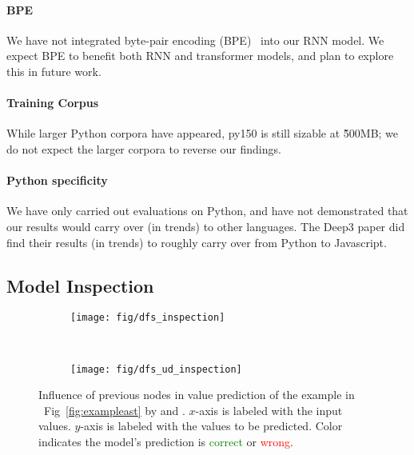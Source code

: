 \documentclass[nonacm, sigconf]{acmart}
\newcommand{\figref}[1]{Fig~\ref{#1}}
\begin{document}
\paragraph{BPE}
We have not integrated byte-pair encoding (BPE)~\cite{karampatsis2020big-bpe} into our RNN model. We expect BPE to benefit both RNN and transformer models, and plan to explore this in future work.

\paragraph{Training Corpus}
While larger Python corpora have appeared,  py150 is still sizable at \~ 500MB; we do not expect the larger corpora to reverse our findings.

\paragraph{Python specificity}
We have only carried out evaluations on Python, and have not demonstrated that our results would carry over (in trends) to other languages.  The Deep3 paper did find their results (in trends) to roughly carry over from Python to Javascript.



 
\subsection{Model Inspection}
\label{sec:inspection}

\begin{figure}
    \centering
    \begin{subfigure}[b]{0.5\textwidth}
        \texttt{[image: fig/dfs\_inspection]}
        \caption{\DFS}
        \label{fig:dfs-pred-influence}
    \end{subfigure}
    \\
\begin{subfigure}[b]{0.5\textwidth}
        \texttt{[image: fig/dfs\_ud\_inspection]}
        \caption{\TreeRel}
        \label{fig:dfs-ud-pred-influence}
    \end{subfigure}
    \caption{Influence of previous nodes in value prediction of the example in ~\figref{fig:exampleast} by \DFS and \TreeRel.
    $x$-axis is labeled with the input values. 
    $y$-axis is labeled with the values to be predicted. 
    Color indicates the model's prediction is \textcolor{green}{correct} or \textcolor{red}{wrong}.}
    \label{fig:pred-influence}
\end{figure}
\end{document}
